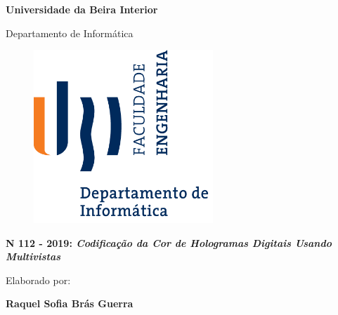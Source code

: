 
\thispagestyle{empty}
\setcounter{page}{-1}

\begin{center}
\begin{Huge}
\textbf{Universidade da Beira Interior}
\end{Huge}
\end{center}

\begin{center}
\begin{Huge}
Departamento de Informática
\end{Huge}
\end{center}

\vspace{0,07cm}
\begin{figure}[!htb]
\centering
\includegraphics[width=191pt]{ubi-fe-di.png}
\end{figure}

\vspace{0.5cm}
\begin{center}
\begin{Large}
\textbf{N\textordmasculine{} 112 - 2019: \emph{Codificação da Cor de Hologramas Digitais Usando Multivistas}}
\end{Large}
\end{center}


\vspace{0.5cm}
\begin{center}
\begin{normalsize}
\begin{large}
Elaborado por:
\end{large}
\end{normalsize}
\end{center}

\vspace{0.2cm}
\begin{center}
\begin{large}
\textbf{Raquel Sofia Brás Guerra}
\end{large}
\end{center}

